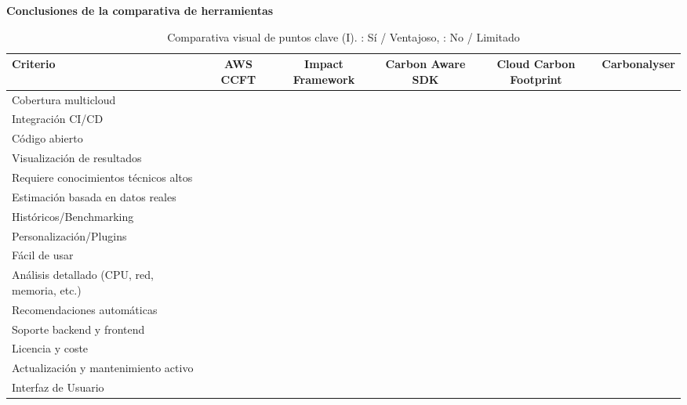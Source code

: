 \documentclass[12pt,a4paper]{report}
\begin{document}
\begin{section}{\textbf{Conclusiones de la comparativa de herramientas}}

\newcommand{\tick}{\textcolor{green!60!black}{\ding{51}}}
\newcommand{\cross}{\textcolor{red}{\ding{55}}}

\begin{landscape}
\begin{table}[H]
\centering
\renewcommand{\arraystretch}{1.3}
\scriptsize
{}
\begin{tabular}{|p{4.2cm}|c|c|c|c|c|}
\hline
\rowcolor{gray!30}
\textbf{Criterio} & \textbf{AWS CCFT} & \textbf{Impact Framework} & \textbf{Carbon Aware SDK} & \textbf{Cloud Carbon Footprint} & \textbf{Carbonalyser} \\
\hline
Cobertura multicloud                         & \cross & \tick & \tick & \tick & \cross \\
Integración CI/CD                            & \cross & \tick & \tick & \cross & \cross \\
Código abierto                               & \cross & \tick & \tick & \tick & \tick \\
Visualización de resultados                  & \tick  & \cross & \tick & \tick & \tick \\
Requiere conocimientos técnicos altos        & \cross & \tick & \tick & \cross & \cross \\
Estimación basada en datos reales            & \cross & \cross & \tick & \cross & \cross \\
Históricos/Benchmarking                      & \tick  & \cross & \cross & \tick & \cross \\
Personalización/Plugins                      & \cross & \tick & \tick & \cross & \cross \\
Fácil de usar                                & \cross & \cross & \cross & \cross & \tick \\
Análisis detallado (CPU, red, memoria, etc.) & \tick  & \cross & \tick & \tick & \cross \\
Recomendaciones automáticas                  & \cross & \cross & \cross & \tick & \cross \\
Soporte backend y frontend                   & \cross & \tick & \tick & \tick & \cross \\
Licencia y coste                             & \cross & \tick & \tick & \tick & \tick \\
Actualización y mantenimiento activo         & \tick  & \tick & \tick & \tick & \cross \\
Interfaz de Usuario                          & \tick  & \cross & \cross & \tick & \tick \\
\hline
\end{tabular}
\caption{Comparativa visual de puntos clave (I). \tick: Sí / Ventajoso, \cross: No / Limitado}
\end{table}
\end{landscape}


\end{section}
\end{document}
